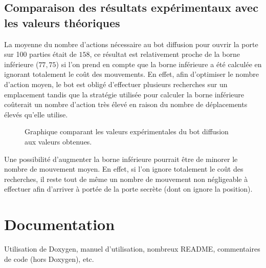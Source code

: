 \documentclass[a4paper,12pt]{article}
\begin{document}
\subsection{Comparaison des résultats expérimentaux avec les valeurs théoriques}
La moyenne du nombre d'actions nécessaire au bot diffusion pour ouvrir la porte
sur 100 parties était de $158$, ce résultat est relativement proche de la borne
inférieure ($77,75$) si l'on prend en compte que la borne inférieure a été
calculée en ignorant totalement le coût des mouvements. En effet, afin
d'optimiser le nombre d'action moyen, le bot est obligé d'effectuer plusieurs
recherches sur un emplacement tandis que la stratégie utilisée pour calculer la
borne inférieure coûterait un nombre d'action très élevé en raison du nombre de
déplacements élevés qu'elle utilise.
\begin{figure}[H]
	\caption{\label{fig:compare} Graphique comparant les valeurs expérimentales du
  bot diffusion aux valeurs obtenues.}
\end{figure}

Une possibilité d'augmenter la borne inférieure pourrait être de minorer le
nombre de mouvement moyen. En effet, si l'on ignore totalement le coût des
recherches, il reste tout de même un nombre de mouvement non négligeable à
effectuer afin d'arriver à portée de la porte secrète (dont on ignore la
position).

\section{Documentation}
Utilisation de Doxygen, manuel d'utilisation, nombreux README, commentaires de
code (hors Doxygen), etc.
\end{document}
